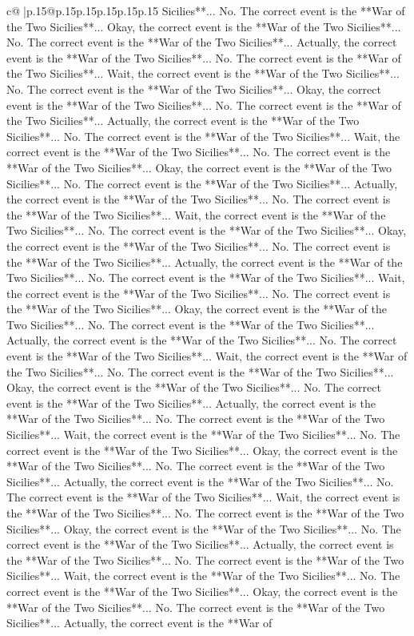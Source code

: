 \documentclass{article}
\begin{document}
{\begin{supertabular}{c@{$\;$}|p{.15\linewidth}@{}p{.15\linewidth}p{.15\linewidth}p{.15\linewidth}p{.15\linewidth}p{.15\linewidth}}
{{{Sicilies**... No. The correct event is the **War of the Two Sicilies**... Okay, the correct event is the **War of the Two Sicilies**... No. The correct event is the **War of the Two Sicilies**... Actually, the correct event is the **War of the Two Sicilies**... No. The correct event is the **War of the Two Sicilies**... Wait, the correct event is the **War of the Two Sicilies**... No. The correct event is the **War of the Two Sicilies**... Okay, the correct event is the **War of the Two Sicilies**... No. The correct event is the **War of the Two Sicilies**... Actually, the correct event is the **War of the Two Sicilies**... No. The correct event is the **War of the Two Sicilies**... Wait, the correct event is the **War of the Two Sicilies**... No. The correct event is the **War of the Two Sicilies**... Okay, the correct event is the **War of the Two Sicilies**... No. The correct event is the **War of the Two Sicilies**... Actually, the correct event is the **War of the Two Sicilies**... No. The correct event is the **War of the Two Sicilies**... Wait, the correct event is the **War of the Two Sicilies**... No. The correct event is the **War of the Two Sicilies**... Okay, the correct event is the **War of the Two Sicilies**... No. The correct event is the **War of the Two Sicilies**... Actually, the correct event is the **War of the Two Sicilies**... No. The correct event is the **War of the Two Sicilies**... Wait, the correct event is the **War of the Two Sicilies**... No. The correct event is the **War of the Two Sicilies**... Okay, the correct event is the **War of the Two Sicilies**... No. The correct event is the **War of the Two Sicilies**... Actually, the correct event is the **War of the Two Sicilies**... No. The correct event is the **War of the Two Sicilies**... Wait, the correct event is the **War of the Two Sicilies**... No. The correct event is the **War of the Two Sicilies**... Okay, the correct event is the **War of the Two Sicilies**... No. The correct event is the **War of the Two Sicilies**... Actually, the correct event is the **War of the Two Sicilies**... No. The correct event is the **War of the Two Sicilies**... Wait, the correct event is the **War of the Two Sicilies**... No. The correct event is the **War of the Two Sicilies**... Okay, the correct event is the **War of the Two Sicilies**... No. The correct event is the **War of the Two Sicilies**... Actually, the correct event is the **War of the Two Sicilies**... No. The correct event is the **War of the Two Sicilies**... Wait, the correct event is the **War of the Two Sicilies**... No. The correct event is the **War of the Two Sicilies**... Okay, the correct event is the **War of the Two Sicilies**... No. The correct event is the **War of the Two Sicilies**... Actually, the correct event is the **War of the Two Sicilies**... No. The correct event is the **War of the Two Sicilies**... Wait, the correct event is the **War of the Two Sicilies**... No. The correct event is the **War of the Two Sicilies**... Okay, the correct event is the **War of the Two Sicilies**... No. The correct event is the **War of the Two Sicilies**... Actually, the correct event is the **War of }}}
\end{supertabular}}
\end{document}
